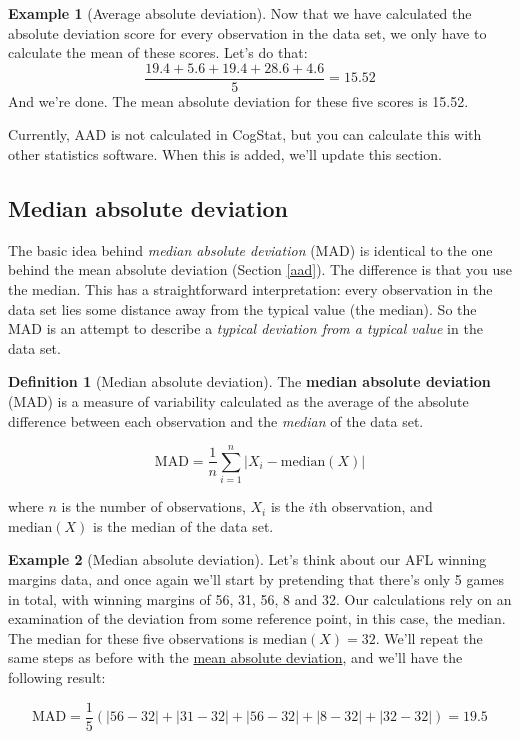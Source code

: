 \documentclass[
  11pt,
]{book}
\theoremstyle{definition}
\newtheorem{definition}{Definition}[chapter]
\theoremstyle{definition}
\newtheorem{example}{Example}[chapter]
\theoremstyle{definition}
\theoremstyle{definition}
\theoremstyle{remark}
\begin{document}
\begin{example}[Average absolute deviation]
Now that we have calculated the absolute deviation score for every observation in the data set, we only have to calculate the mean of these scores. Let's do that:
\[
\frac{19.4 + 5.6 + 19.4 + 28.6 + 4.6}{5} = 15.52
\]
And we're done. The mean absolute deviation for these five scores is 15.52.
\end{example}

Currently, AAD is not calculated in CogStat, but you can calculate this with other statistics software. When this is added, we'll update this section.

\hypertarget{mad}{%
\subsection{Median absolute deviation}\label{mad}}

The basic idea behind \emph{median absolute deviation} (MAD) is identical to the one behind the mean absolute deviation (Section \ref{aad}). The difference is that you use the median. This has a straightforward interpretation: every observation in the data set lies some distance away from the typical value (the median). So the MAD is an attempt to describe a \emph{typical deviation from a typical value} in the data set.

\begin{definition}[Median absolute deviation]
\protect\hypertarget{def:defMAD}{}\label{def:defMAD}The \textbf{median absolute deviation} (MAD) is a measure of variability calculated as the average of the absolute difference between each observation and the \emph{median} of the data set.

\[
\text{MAD} = \frac{1}{n} \sum_{i=1}^n |X_i - \text{median}(X)|
\]

where \(n\) is the number of observations, \(X_i\) is the \(i\)th observation, and \(\text{median}(X)\) is the median of the data set.
\end{definition}

\begin{example}[Median absolute deviation]
\protect\hypertarget{exm:exMAD}{}\label{exm:exMAD}Let's think about our AFL winning margins data, and once again we'll start by pretending that there's only 5 games in total, with winning margins of 56, 31, 56, 8 and 32. Our calculations rely on an examination of the deviation from some reference point, in this case, the median. The median for these five observations is \(\text{median}(X) = 32\). We'll repeat the same steps as before with the \protect\hyperlink{exAAD}{mean absolute deviation}, and we'll have the following result:

\[
\text{MAD} = \frac{1}{5} \left( |56 - 32| + |31 - 32| + |56 - 32| + |8 - 32| + |32 - 32| \right) = 19.5
\]
\end{example}
\end{document}
